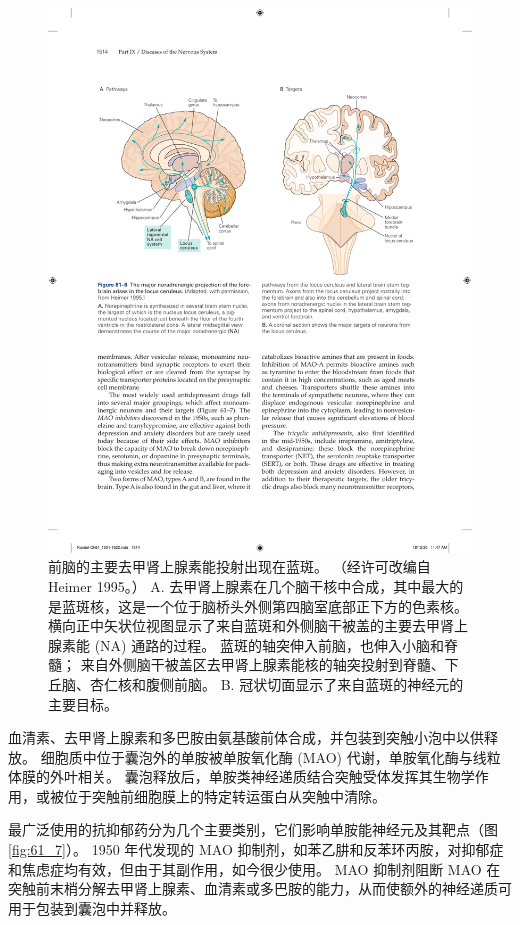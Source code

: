 \begin{figure}[htbp]
	\centering
	\includegraphics[width=0.9\linewidth]{chap61/fig_61_6}
	\caption{前脑的主要去甲肾上腺素能投射出现在蓝斑。 （经许可改编自 Heimer 1995。） A. 去甲肾上腺素在几个脑干核中合成，其中最大的是蓝斑核，这是一个位于脑桥头外侧第四脑室底部正下方的色素核。 横向正中矢状位视图显示了来自蓝斑和外侧脑干被盖的主要去甲肾上腺素能 (NA) 通路的过程。 蓝斑的轴突伸入前脑，也伸入小脑和脊髓； 来自外侧脑干被盖区去甲肾上腺素能核的轴突投射到脊髓、下丘脑、杏仁核和腹侧前脑。 B. 冠状切面显示了来自蓝斑的神经元的主要目标。}
	\label{fig:61_6}
\end{figure}

血清素、去甲肾上腺素和多巴胺由氨基酸前体合成，并包装到突触小泡中以供释放。 细胞质中位于囊泡外的单胺被单胺氧化酶 (MAO) 代谢，单胺氧化酶与线粒体膜的外叶相关。 囊泡释放后，单胺类神经递质结合突触受体发挥其生物学作用，或被位于突触前细胞膜上的特定转运蛋白从突触中清除。

最广泛使用的抗抑郁药分为几个主要类别，它们影响单胺能神经元及其靶点（图 \ref{fig:61_7}）。 1950 年代发现的 MAO 抑制剂，如苯乙肼和反苯环丙胺，对抑郁症和焦虑症均有效，但由于其副作用，如今很少使用。 MAO 抑制剂阻断 MAO 在突触前末梢分解去甲肾上腺素、血清素或多巴胺的能力，从而使额外的神经递质可用于包装到囊泡中并释放。

